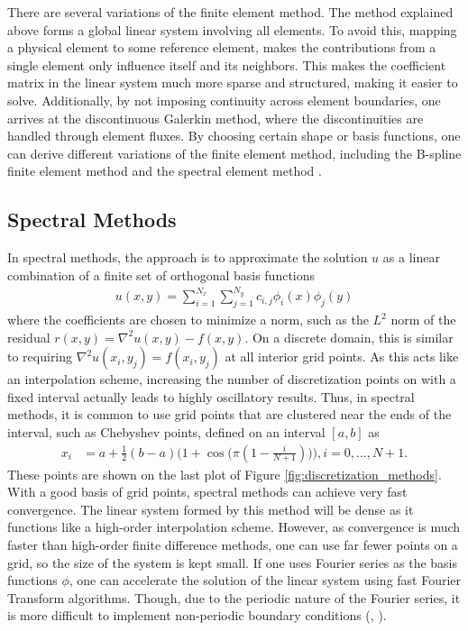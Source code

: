 There are several variations of the finite element method. The method explained above forms a global linear system involving all elements. To avoid this, mapping a physical element to some reference element, makes the contributions from a single element only influence itself and its neighbors. This makes the coefficient matrix in the linear system much more sparse and structured, making it easier to solve. Additionally, by not imposing continuity across element boundaries, one arrives at the discontinuous Galerkin method, where the discontinuities are handled through element fluxes. By choosing certain shape or basis functions, one can derive different variations of the finite element method, including the B-spline finite element method \cite{kagan1998new} and the spectral element method \cite{patera1984spectral}.

\subsection{Spectral Methods}

In spectral methods, the approach is to approximate the solution $u$ as a linear combination of a finite set of orthogonal basis functions
\begin{align}
    u(x,y) = \sum_{i=1}^{N_x} \sum_{j=1}^{N_y} c_{i,j} \phi_{i}(x) \phi_{j}(y)
\end{align}
where the coefficients are chosen to minimize a norm, such as the $L^2$ norm of the residual $r(x,y) = \nabla^2 u(x,y) - f(x,y)$. On a discrete domain, this is similar to requiring $\nabla^2 u(x_i, y_j) = f(x_i, y_j)$ at all interior grid points. As this acts like an interpolation scheme, increasing the number of discretization points on with a fixed interval actually leads to highly oscillatory results. Thus, in spectral methods, it is common to use grid points that are clustered near the ends of the interval, such as Chebyshev points, defined on an interval $[a,b]$ as
\begin{align}
    x_i &= a + \frac{1}{2}(b - a)\Big(1 + \cos \big( \pi (1 - \frac{i}{N + 1}) \big) \Big), i = 0, ..., N + 1.
\end{align}
These points are shown on the last plot of Figure \ref{fig:discretization_methods}. With a good basis of grid points, spectral methods can achieve very fast convergence. The linear system formed by this method will be dense as it functions like a high-order interpolation scheme. However, as convergence is much faster than high-order finite difference methods, one can use far fewer points on a grid, so the size of the system is kept small. If one uses Fourier series as the basis functions $\phi$, one can accelerate the solution of the linear system using fast Fourier Transform algorithms. Though, due to the periodic nature of the Fourier series, it is more difficult to implement non-periodic boundary conditions (\cite{leveque2007finite}, \cite{townsend2015automatic}).

